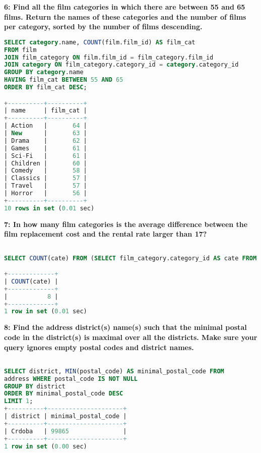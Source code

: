 \documentclass[12pt]{article}
\begin{document}
\textbf{6: Find all the film categories in which there are between 55 and 65 films. Return the names of these categories and the number of films per category, sorted by the number of films descending.}
\begin{lstlisting}[language=SQL]
SELECT category.name, COUNT(film.film_id) AS film_cat
FROM film
JOIN film_category ON film.film_id = film_category.film_id
JOIN category ON film_category.category_id = category.category_id 
GROUP BY category.name
HAVING film_cat BETWEEN 55 AND 65
ORDER BY film_cat DESC;

+----------+----------+
| name     | film_cat |
+----------+----------+
| Action   |       64 |
| New      |       63 |
| Drama    |       62 |
| Games    |       61 |
| Sci-Fi   |       61 |
| Children |       60 |
| Comedy   |       58 |
| Classics |       57 |
| Travel   |       57 |
| Horror   |       56 |
+----------+----------+
10 rows in set (0.01 sec)

\end{lstlisting}

\textbf{7: In how many film categories is the average difference between the film replacement cost and the rental rate larger than 17?}
\begin{lstlisting}[language=SQL]

SELECT COUNT(cate) FROM (SELECT film_category.category_id AS cate FROM film JOIN film_category ON film.film_id = film_category.film_id GROUP BY film_category.category_id HAVING ABS(AVG(replacement_cost)-AVG(rental_rate)) > 17) AS A;

+-------------+
| COUNT(cate) |
+-------------+
|           8 |
+-------------+
1 row in set (0.01 sec)
\end{lstlisting}

\textbf{8: Find the address district(s) name(s) such that the minimal postal code in the district(s) is maximal over all the districts. Make sure your query ignores empty postal codes and district names.}
\begin{lstlisting}[language=SQL]

SELECT district, MIN(postal_code) AS minimal_postal_code FROM
address WHERE postal_code IS NOT NULL
GROUP BY district
ORDER BY minimal_postal_code DESC
LIMIT 1;
+----------+---------------------+
| district | minimal_postal_code |
+----------+---------------------+
| Crdoba   | 99865               |
+----------+---------------------+
1 row in set (0.00 sec)
\end{lstlisting}
\end{document}
